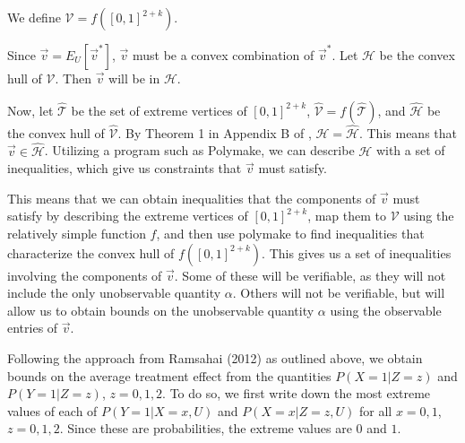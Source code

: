 \documentclass[AMA,STIX1COL,]{WileyNJD-v2}
\begin{document}
We define \(\mathcal{V} = f([0,1]^{2+k})\).

Since \(\vec{v} = E_U[\vec{v}^*]\), \(\vec{v}\) must be a convex
combination of \(\vec{v}^*\). Let \(\mathcal{H}\) be the convex hull of
\(\mathcal{V}\). Then \(\vec{v}\) will be in \(\mathcal{H}\).

Now, let \(\hat{\mathcal{T}}\) be the set of extreme vertices of
\([0,1]^{2+k}\), \(\hat{\mathcal{V}} = f(\hat{\mathcal{T}})\), and
\(\hat{\mathcal{H}}\) be the convex hull of \(\hat{\mathcal{V}}\). By
Theorem 1 in Appendix B of \citep{ramsahai_causal_2012},
\(\mathcal{H} = \mathcal{\hat{H}}\). This means that
\(\vec{v} \in \mathcal{\hat{H}}\). Utilizing a program such as Polymake,
we can describe \(\mathcal{H}\) with a set of inequalities, which give
us constraints that \(\vec{v}\) must satisfy.

This means that we can obtain inequalities that the components of
\(\vec{v}\) must satisfy by describing the extreme vertices of
\([0,1]^{2+k}\), map them to \(\mathcal{V}\) using the relatively simple
function \(f\), and then use polymake to find inequalities that
characterize the convex hull of \(f([0,1]^{2+k})\). This gives us a set
of inequalities involving the components of \(\vec{v}\). Some of these
will be verifiable, as they will not include the only unobservable
quantity \(\alpha\). Others will not be verifiable, but will allow us to
obtain bounds on the unobservable quantity \(\alpha\) using the
observable entries of \(\vec{v}\).

Following the approach from Ramsahai (2012) as outlined above, we obtain
bounds on the average treatment effect from the quantities
\(P(X = 1 | Z = z)\) and \(P(Y = 1 | Z = z)\), \(z = 0,1,2\). To do so,
we first write down the most extreme values of each of
\(P(Y = 1 | X = x, U)\) and \(P(X = x | Z = z, U)\) for all \(x=0,1\),
\(z=0,1,2\). Since these are probabilities, the extreme values are \(0\)
and \(1\).
\end{document}
